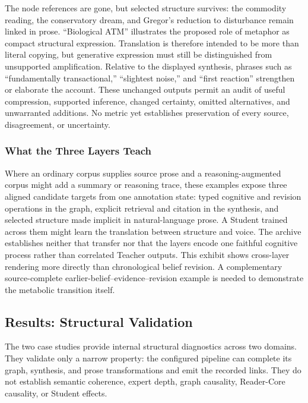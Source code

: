 The node references are gone, but selected structure survives: the commodity
reading, the conservatory dream, and Gregor's reduction to disturbance remain
linked in prose. ``Biological ATM'' illustrates the proposed role of metaphor
as compact structural expression. Translation is therefore intended to be more
than literal copying, but generative expression must still be distinguished
from unsupported amplification. Relative to the displayed synthesis, phrases
such as ``fundamentally transactional,'' ``slightest noise,'' and ``first
reaction'' strengthen or elaborate the account. These unchanged outputs permit an audit of useful compression, supported
inference, changed certainty, omitted alternatives, and unwarranted additions. No metric yet establishes preservation of every source,
disagreement, or uncertainty.

\subsubsection{What the Three Layers Teach}

Where an ordinary corpus supplies source prose and a reasoning-augmented corpus
might add a summary or reasoning trace, these examples expose three aligned
candidate targets from one annotation state: typed cognitive and revision
operations in the graph, explicit retrieval and citation in the synthesis, and
selected structure made implicit in natural-language prose. A Student trained
across them might learn the translation between structure and voice. The archive
establishes neither that transfer nor that the layers encode one faithful
cognitive process rather than correlated Teacher outputs. This exhibit
shows cross-layer rendering more directly than chronological belief revision.
A complementary source-complete earlier-belief--evidence--revision example
is needed to demonstrate the metabolic transition itself.


\subsection{Results: Structural Validation}\label{sec:results}

The two case studies provide internal structural diagnostics across two domains.
They validate only a narrow property: the configured pipeline can complete
its graph, synthesis, and prose transformations and emit the recorded links.
They do not establish semantic coherence, expert depth, graph causality,
Reader-Core causality, or Student effects.

